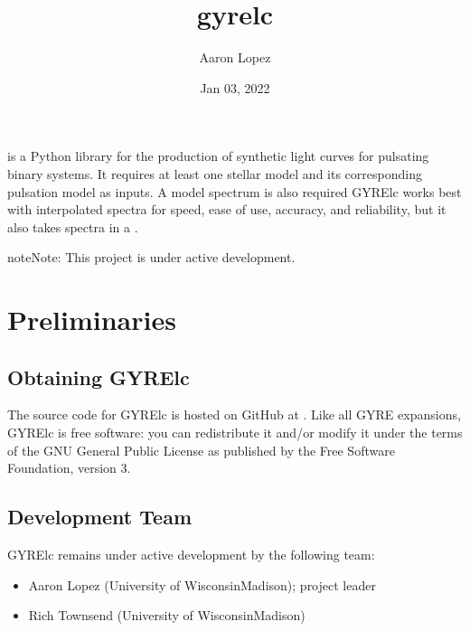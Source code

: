 \documentclass[letterpaper,10pt,english]{sphinxmanual}
\title{gyre\sphinxhyphen{}lc}
\date{Jan 03, 2022}
\author{Aaron Lopez}
\begin{document}
\pagestyle{empty}
\sphinxmaketitle
\pagestyle{plain}
\sphinxtableofcontents
\pagestyle{normal}
\label{\detokenize{index::doc}}


\sphinxAtStartPar
{} is a Python library for the production of synthetic light curves for pulsating binary systems. It requires at least one  stellar model and its corresponding  pulsation model as inputs. A model spectrum is also required\textendash{} GYRE\sphinxhyphen{}lc works best with  interpolated spectra for speed, ease of use, accuracy, and reliability, but it also takes  spectra in a .

\begin{sphinxadmonition}{note}{Note:}
\sphinxAtStartPar
This project is under active development.
\end{sphinxadmonition}


\chapter{Preliminaries}
\label{\detokenize{user-guide/preliminaries:preliminaries}}\label{\detokenize{user-guide/preliminaries::doc}}

\section{Obtaining GYRE\sphinxhyphen{}lc}
\label{\detokenize{user-guide/preliminaries:obtaining-gyre-lc}}
\sphinxAtStartPar
The source code for GYRE\sphinxhyphen{}lc is hosted on GitHub at . Like all GYRE expansions, GYRE\sphinxhyphen{}lc is free software: you can redistribute it and/or modify it under the terms of the GNU General Public License as published by the Free Software Foundation, version 3.


\section{Development Team}
\label{\detokenize{user-guide/preliminaries:development-team}}
\sphinxAtStartPar
GYRE\sphinxhyphen{}lc remains under active development by the following team:
\begin{itemize}
\item {} 
\sphinxAtStartPar
Aaron Lopez (University of Wisconsin\sphinxhyphen{}Madison); project leader

\item {} 
\sphinxAtStartPar
Rich Townsend (University of Wisconsin\sphinxhyphen{}Madison)

\end{itemize}
\end{document}
